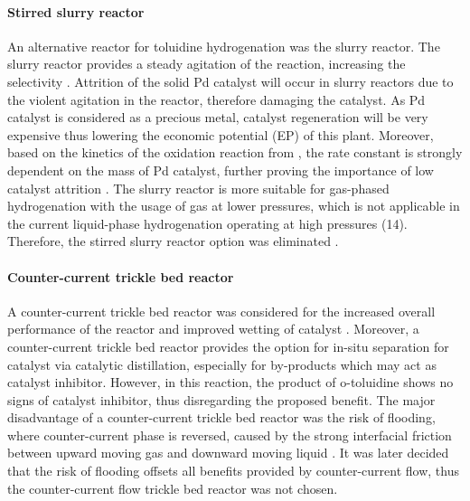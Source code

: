 \paragraph{Stirred slurry reactor}
An alternative reactor for toluidine hydrogenation was the slurry reactor. The slurry reactor provides a steady agitation of the reaction, increasing the selectivity \cite{p_a_ramachandran_recent_1987}. Attrition of the solid Pd catalyst will occur in slurry reactors due to the violent agitation in the reactor, therefore damaging the catalyst. As Pd catalyst is considered as a precious metal, catalyst regeneration will be very expensive thus lowering the economic potential (EP) of this plant. Moreover, based on the kinetics of the oxidation reaction from  , the rate constant is strongly dependent on the mass of Pd catalyst, further proving the importance of low catalyst attrition \cite{rajadhyaksha_solvent_1986}.
The slurry reactor is more suitable for gas-phased hydrogenation with the usage of  gas at lower pressures, which is not applicable in the current liquid-phase hydrogenation operating at high pressures (\SI{14}{\atm}). Therefore, the stirred slurry reactor option was eliminated \cite{ranade_chapter_2011}.


\paragraph{Counter-current trickle bed reactor}
A counter-current trickle bed reactor was considered for the increased overall performance of the reactor and improved wetting of catalyst \cite{kundu_novel_2003}. Moreover, a counter-current trickle bed reactor provides the option for in-situ separation for catalyst via catalytic distillation, especially for by-products which may act as catalyst inhibitor. However, in this reaction, the product of o-toluidine shows no signs of catalyst inhibitor, thus disregarding the proposed benefit. The major disadvantage of a counter-current trickle bed reactor was the risk of flooding, where counter-current phase is reversed, caused by the strong interfacial friction between upward moving gas and downward moving liquid \cite{breijer_prevention_2008}. It was later decided that the risk of flooding offsets all benefits provided by counter-current flow, thus the counter-current flow trickle bed reactor was not chosen. 

